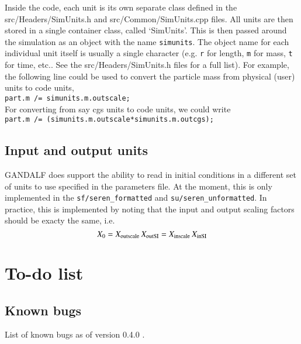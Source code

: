 \documentclass[a4paper]{article}
\newcommand{\VERNO}{0.4.0 }
\newcommand{\var}[1]{\texttt{#1}}
\begin{document}
Inside the code, each unit is its own separate class defined in the src/Headers/SimUnits.h and src/Common/SimUnits.cpp files.  All units are then stored in a single container class, called `SimUnits'.  This is then passed around the simulation as an object with the name \var{simunits}.  The object name for each individual unit itself is usually a single character (e.g. \var{r} for length, \var{m} for mass, \var{t} for time, etc..  See the src/Headers/SimUnits.h files for a full list).  For example, the following line could be used to convert the particle mass from physical (user) units to code units,  \\
\newline
\noindent \var{part.m /= simunits.m.outscale;} \\

\noindent For converting from say cgs units to code units, we could write \\
\newline
\noindent \var{part.m /= (simunits.m.outscale*simunits.m.outcgs);} \\





\subsection{Input and output units}
GANDALF does support the ability to read in initial conditions in a different set of units to use specified in the parameters file.  At the moment, this is only implemented in the \var{sf/seren\_formatted} and \var{su/seren\_unformatted}.  In practice, this is implemented by noting that the input and output scaling factors should be exacty the same, i.e.
\begin{equation}
X_0 = X_{\rm outscale} \, X_{\rm outSI} = X_{\rm inscale} \, X_{\rm inSI}
\end{equation}




\newpage


\section{To-do list}

\subsection{Known bugs}
List of known bugs as of version \VERNO.
\end{document}
